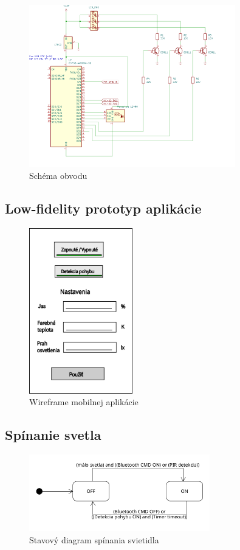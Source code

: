 \documentclass[12pt, a4paper]{article}
\begin{document}
\begin{figure}
	\centering
	\includegraphics[width=0.8\textwidth]{assets/electrical-schematics.png}
	\caption{Schéma obvodu}
\end{figure}

\subsection{Low-fidelity prototyp aplikácie}
\begin{figure}
	\centering
	\includegraphics[width=0.4\textwidth]{assets/wireframe.png}
	\caption{Wireframe mobilnej aplikácie}
\end{figure}

\subsection{Spínanie svetla}
\begin{figure}
    \centering
	\includegraphics[width=0.7\textwidth]{assets/light-states.png}
	\caption{Stavový diagram spínania svietidla}
\end{figure}
\end{document}
